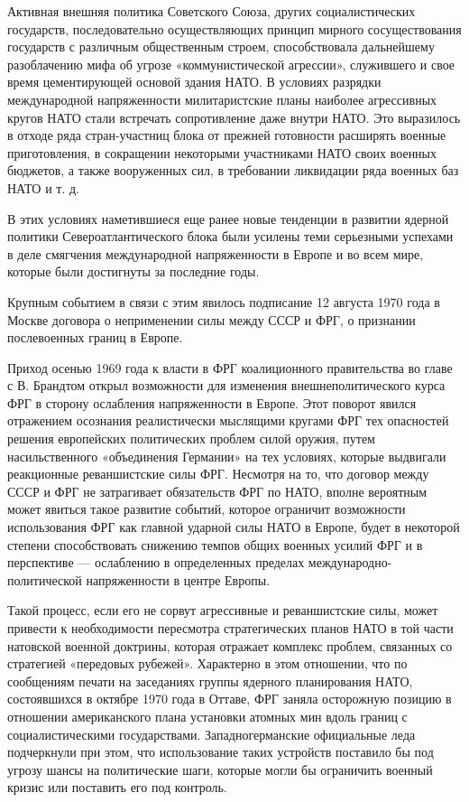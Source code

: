 \documentclass[12pt, a4paper, openany]{book}
\begin{document}
Активная внешняя политика Советского Союза, других социалистических государств, последовательно осуществляющих принцип мирного сосуществования государств с различным общественным строем, способствовала дальнейшему разоблачению мифа об угрозе «коммунистической агрессии», служившего и свое время цементирующей основой здания НАТО. В условиях разрядки международной напряженности милитаристские планы наиболее агрессивных кругов НАТО стали встречать сопротивление даже внутри НАТО. Это выразилось в отходе ряда стран-участниц блока от прежней готовности расширять военные приготовления, в сокращении некоторыми участниками НАТО своих военных бюджетов, а также вооруженных сил, в требовании ликвидации ряда военных баз НАТО и т. д.
	
В этих условиях наметившиеся еще ранее новые тенденции в развитии ядерной политики Североатлантического блока были усилены теми серьезными успехами в деле смягчения международной напряженности в Европе и во всем мире, которые были достигнуты за последние годы.
	
Крупным событием в связи с этим явилось подписание 12 августа 1970 года в Москве договора о неприменении силы между СССР и ФРГ, о признании послевоенных границ в Европе.
	
Приход осенью 1969 года к власти в ФРГ коалиционного правительства во главе с В. Брандтом открыл возможности для изменения внешнеполитического курса ФРГ в сторону ослабления напряженности в Европе. Этот поворот явился отражением осознания реалистически мыслящими кругами ФРГ тех опасностей решения европейских политических проблем силой оружия, путем насильственного «объединения Германии» на тех условиях, которые выдвигали реакционные реваншистские силы ФРГ. Несмотря на то, что договор между СССР и ФРГ не затрагивает обязательств ФРГ по НАТО, вполне вероятным может явиться такое развитие событий, которое ограничит возможности использования ФРГ как главной ударной силы НАТО в Европе, будет в некоторой степени способствовать снижению темпов общих военных усилий ФРГ и в перспективе — ослаблению в определенных пределах международно-политической напряженности в центре Европы.
	
Такой процесс, если его не сорвут агрессивные и реваншистские силы, может привести к необходимости пересмотра стратегических планов НАТО в той части натовской военной доктрины, которая отражает комплекс проблем, связанных со стратегией «передовых рубежей». Характерно в этом отношении, что по сообщениям печати на заседаниях группы ядерного планирования НАТО, состоявшихся в октябре 1970 года в Оттаве, ФРГ заняла осторожную позицию в отношении американского плана установки атомных мин вдоль границ с социалистическими государствами. Западногерманские официальные леда подчеркнули при этом, что использование таких устройств поставило бы под угрозу шансы на политические шаги, которые могли бы ограничить военный кризис или поставить его под контроль.
	
\end{document}
